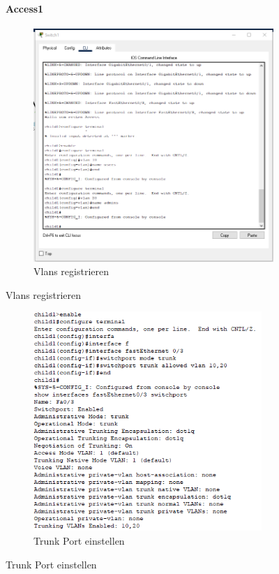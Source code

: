 \begin{figure}[!htb]
    \paragraph{Access1}
    \centering
    \begin{subfigure}{\textwidth}
        \includegraphics[width=\textwidth]{./img/Access1/vlan_10-20.png}
        \caption{Vlans registrieren}
    \end{subfigure}
\end{figure}
\begin{figure}[!htb]\ContinuedFloat
    \centering
    \begin{subfigure}{\textwidth}
        \includegraphics[width=0.95\textwidth]{./img/Access1/trunk.png}
        \caption{Trunk Port einstellen}
    \end{subfigure}
\end{figure}

